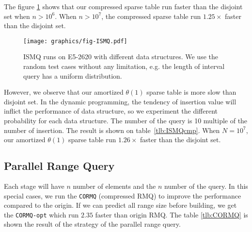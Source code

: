 The figure \ref{fig:fig-ISMQcmp} shows that our compressed sparse
table run faster than the disjoint set when $n > 10^6$.  When $n >
10^7$, the compressed sparse table run $1.25 \times$ faster than the
disjoint set.  



\begin{figure}[!thb]
  \centering
  \texttt{[image: graphics/fig-ISMQ.pdf]}
  \caption{
  ISMQ runs on E5-2620 with different data structures. We use the
random test cases without any limitation, e.g. the length of interval
query has a uniform distribution.   
  }
  \label{fig:fig-ISMQcmp}
\end{figure}

However, we observe that our amortized $\theta(1)$ sparse table is
more slow than disjoint set.  In the dynamic programming, the tendency
of insertion value will inflict the performance of data structure, so
we experiment the different probability for each data structure.  The
number of the query is 10 multiple of the number of insertion.  The
result is shown on table~\ref{tlb:ISMQcmp}.  When $N=10^7$, our
amortized $\theta(1)$ sparse table run $1.26 \times$ faster than the
disjoint set.

\iffalse
當運行 $n > 10^6$ 時，我們提出的壓縮稀疏表的效能已經勝過并查集的版本，
其運行結果如圖表 ~\ref{fig:fig-ISMQcmp}。在 $n = 10^7$ 時，加速 $1.25 \times$。
然而，我們提供的 amortized $\theta(1)$ 的稀疏表慢於并查集，
我們做了深入的機率探討 (參照表 ~\ref{tlb:ISMQcmp})，由於大部分的操作都被區塊後綴和前綴解決，
沒有實際運用到內部詢問，約束區間詢問的大小為 $L$，在 $N = 10^7$ 時，最多能加速 $1.26 \times$，
其中插入和詢問比例為 1:10，當詢問比重更大時，將有更明顯的加速。
\fi



\subsection{Parallel Range Query}

Each stage will have $n$ number of elements and the $n$ number of the
query.  In this special cases, we run the {\tt CORMQ} (compressed
RMQ) to improve the performance compared to the origin.  If we can
predict all range size before building, we get the {\tt CORMQ-opt}
which run $2.35$ faster than origin RMQ.  The table \ref{tlb:CORMQ} is
shown the result of the strategy of the parallel range query.

\iffalse
每一次有 $n$ 個元素和 $n$ 組詢問，針對這種特殊性質的問題，
我們運行樸素的 \texttt{CORMQ} (compressed RMQ) 得到效能改善，
搭配可預測的分析降低運算量 (參照 \texttt{CORMQ-opt})，得到更好的改善。
在 \texttt{CORMQ-opt} 策略中，得到 $2.35 \times$ 倍的加速，結果如表 ~\ref{tlb:CORMQ}。
\fi

